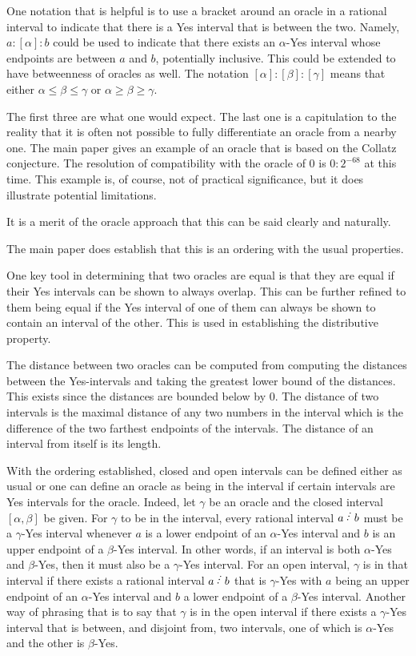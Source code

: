 \documentclass[12pt]{article}
\begin{document}
One notation that is helpful is to use a bracket around an oracle in a rational interval to indicate that there is a Yes interval that is between the two. Namely, $a: [\alpha] : b$ could be used to indicate that there exists an  $\alpha$-Yes interval whose endpoints are between $a$ and $b$, potentially inclusive. This could be extended to have betweenness of oracles as well. The notation $[\alpha] : [\beta] : [\gamma]$ means that either $ \alpha \leq \beta \leq \gamma$ or $\alpha \geq \beta \geq \gamma$.

The first three are what one would expect. The last one is a capitulation to the reality that it is often not possible to fully differentiate an oracle from a nearby one. The main paper gives an example of an oracle that is based on the Collatz conjecture. The resolution of compatibility with the oracle of 0 is $0:2^{-68}$ at this time. This example is, of course, not of practical significance, but it does illustrate potential limitations. 

 It is a merit of the oracle approach that this can be said clearly and naturally. 

The main paper does establish that this is an ordering with the usual properties. 

One key tool in determining that two oracles are equal is that they are equal if their Yes intervals can be shown to always overlap. This can be further refined to them being equal if the Yes interval of one of them can always be shown to contain an interval of the other. This is used in establishing the distributive property. 

The distance between two oracles can be computed from computing the distances between the Yes-intervals and taking the greatest lower bound of the distances. This exists since the distances are bounded below by 0. The distance of two intervals is the maximal distance of any two numbers in the interval which is the difference of the two farthest endpoints of the intervals. The distance of an interval from itself is its length. 

With the ordering established, closed and open intervals can be defined either as usual or one can define an oracle as being in the interval if certain intervals are Yes intervals for the oracle. Indeed, let $\gamma$ be an oracle and the closed interval $[\alpha, \beta]$ be given. For $\gamma$ to be in the interval, every rational interval $a\lte b$ must be a $\gamma$-Yes interval whenever $a$ is a lower endpoint of an $\alpha$-Yes interval and $b$ is an upper endpoint of a $\beta$-Yes interval. In other words, if an interval is both $\alpha$-Yes and $\beta$-Yes, then it must also be a $\gamma$-Yes interval. For an open interval, $\gamma$ is in that interval if there exists a rational interval $a\lte b$ that is $\gamma$-Yes with $a$ being an upper endpoint of an $\alpha$-Yes interval and $b$ a lower endpoint of a $\beta$-Yes interval. Another way of phrasing that is to say that $\gamma$ is in the open interval if there exists a $\gamma$-Yes interval that is between, and disjoint from, two intervals, one of which is $\alpha$-Yes and the other is $\beta$-Yes. 
\end{document}
